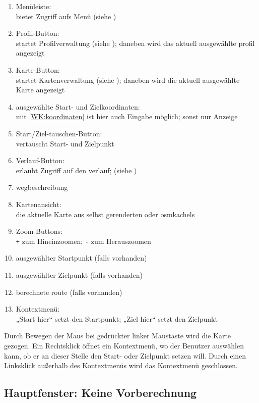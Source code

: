 \documentclass[a4paper, 11pt]{article}
\begin{document}
\begin{enumerate}
\item Menüleiste:\\
bietet Zugriff aufs Menü (siehe )
\item Profil-Button:\\
startet Profilverwaltung (siehe ); daneben wird das aktuell ausgewählte \gls{profil} angezeigt
\item Karte-Button:\\
startet Kartenverwaltung (siehe ); daneben wird die aktuell ausgewählte Karte angezeigt
\item ausgewählte Start- und Zielkoordinaten:\\
mit \ref{WK:koordinaten} ist hier auch Eingabe möglich; sonst nur Anzeige
\item Start/Ziel-tauschen-Button:\\
vertauscht Start- und Zielpunkt
\item Verlauf-Button:\\
erlaubt Zugriff auf den \gls{verlauf}; (siehe )
\item \gls{wegbeschreibung}
\item Kartenansicht:\\
die aktuelle Karte aus selbst gerenderten oder \glspl{osmkachel}
\item Zoom-Buttons:\\
\texttt{+} zum Hineinzoomen; \texttt{-} zum Herauszoomen
\item ausgewählter Startpunkt (falls vorhanden)
\item ausgewählter Zielpunkt (falls vorhanden)
\item berechnete \gls{route} (falls vorhanden)
\item Kontextmenü:\\
„Start hier“ setzt den Startpunkt; „Ziel hier“ setzt den Zielpunkt
\end{enumerate}

Durch Bewegen der Maus bei gedrückter linker Maustaste wird die Karte gezogen. Ein Rechtsklick öffnet ein Kontextmenü, wo der Benutzer auswählen kann, ob er an dieser Stelle den Start- oder Zielpunkt setzen will. Durch einen Linksklick außerhalb des Kontextmenüs wird das Kontextmenü geschlossen.

\subsection{Hauptfenster: Keine Vorberechnung}
\end{document}
